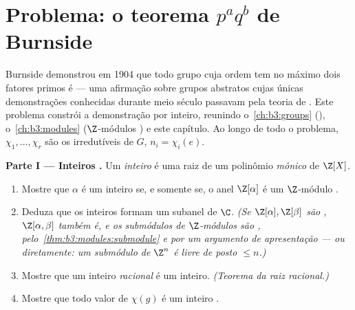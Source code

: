 \section{Problema: o teorema \texorpdfstring{$p^aq^b$}{paqb} de
Burnside}

\begin{problem}\label{pb:b3:representations:1}
Burnside demonstrou em 1904 que todo grupo cuja ordem tem no máximo
dois fatores primos é  --- uma afirmação sobre grupos abstratos
cujas únicas demonstrações conhecidas durante meio século passavam pela
teoria de . Este problema constrói a demonstração por
inteiro, reunindo o~\cref{ch:b3:groups} (), o~\cref{ch:b3:modules}
($\Z$-módulos ) e este capítulo. Ao longo de todo
o problema, $\chi_1, \dots, \chi_r$ são os  irredutíveis de $G$, $n_i = \chi_i(e)$.

\medskip
\noindent\textbf{Parte I --- Inteiros .} Um \emph{inteiro
} é uma raiz de um polinômio \emph{mônico} de $\Z[X]$.
\begin{enumerate}
  \item Mostre que $\alpha$ é um inteiro  se, e somente
        se, o anel $\Z[\alpha]$ é um $\Z$-módulo .
  \item Deduza que os inteiros  formam um subanel de
        $\C$. \emph{(Se $\Z[\alpha], \Z[\beta]$ são , $\Z[\alpha, \beta]$ também
        é, e os submódulos de $\Z$-módulos  são
        , pelo~\cref{thm:b3:modules:submodule} e por um argumento de
        apresentação --- ou diretamente: um submódulo de $\Z^n$ é
        livre de posto $\leq n$.)}
  \item Mostre que um inteiro  \emph{racional} é um inteiro.
        \emph{(Teorema da raiz racional.)}
  \item Mostre que todo valor de  $\chi(g)$ é um inteiro .
\end{enumerate}


\end{problem}
